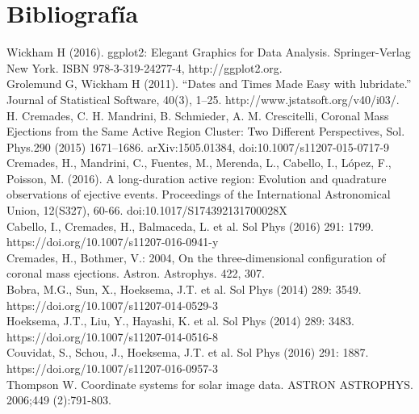 \documentclass[12pt,a4paper,spanish]{article}
\begin{document}
\newpage
\section{Bibliografía}

Wickham H (2016). ggplot2: Elegant Graphics for Data Analysis. Springer-Verlag New York. ISBN 978-3-319-24277-4, http://ggplot2.org. \\

Grolemund G, Wickham H (2011). “Dates and Times Made Easy with lubridate.” Journal of Statistical Software, 40(3), 1–25. http://www.jstatsoft.org/v40/i03/. \\

H. Cremades, C. H. Mandrini, B. Schmieder, A. M. Crescitelli, Coronal Mass Ejections from the Same Active Region Cluster: Two Different Perspectives, Sol. Phys.290 (2015) 1671–1686. arXiv:1505.01384, doi:10.1007/s11207-015-0717-9 \\

Cremades, H., Mandrini, C., Fuentes, M., Merenda, L., Cabello, I., López, F., Poisson, M. (2016). A long-duration active region: Evolution and quadrature observations of ejective events. Proceedings of the International Astronomical Union, 12(S327), 60-66. doi:10.1017/S174392131700028X \\

Cabello, I., Cremades, H., Balmaceda, L. et al. Sol Phys (2016) 291: 1799.\\ https://doi.org/10.1007/s11207-016-0941-y \\

Cremades, H., Bothmer, V.: 2004, On the three-dimensional configuration of coronal mass ejections. Astron. Astrophys. 422, 307.  \\

Bobra, M.G., Sun, X., Hoeksema, J.T. et al. Sol Phys (2014) 289: 3549.\\ https://doi.org/10.1007/s11207-014-0529-3 \\

Hoeksema, J.T., Liu, Y., Hayashi, K. et al. Sol Phys (2014) 289: 3483.\\ https://doi.org/10.1007/s11207-014-0516-8 \\

Couvidat, S., Schou, J., Hoeksema, J.T. et al. Sol Phys (2016) 291: 1887.\\ https://doi.org/10.1007/s11207-016-0957-3 \\

Thompson W. Coordinate systems for solar image data. ASTRON ASTROPHYS. 2006;449 (2):791-803. \\
\end{document}
